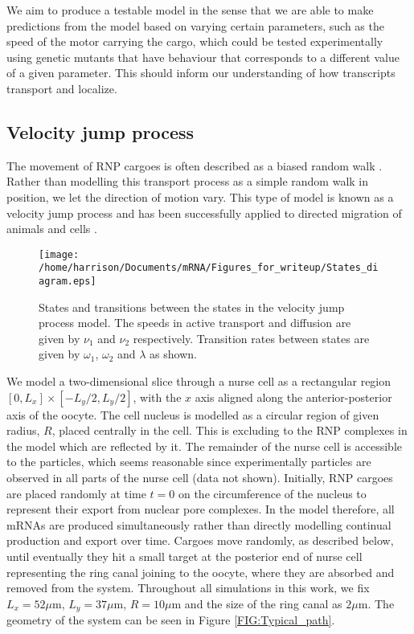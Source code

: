\documentclass[twocolumn]{biophys}
\begin{document}
We aim to produce a testable model in the sense that we are able to make predictions from the model based on varying certain parameters, such as the speed of the motor carrying the cargo, which could be tested experimentally using genetic mutants that have behaviour that corresponds to a different value of a given parameter. 
This should inform our understanding of how transcripts transport and localize.

\subsection{Velocity jump process} \label{VJ model}
The movement of RNP cargoes is often described as a biased random walk \citep{zimyanin2008vivo}.
Rather than modelling this transport process as a simple random walk in position, we let the direction of motion vary. 
This type of model is known as a velocity jump process and has been successfully applied to directed migration of animals and cells \citep{codling2005calculating, taylorking2015birds}.

\begin{figure}[h]
 \centering
 \texttt{[image: /home/harrison/Documents/mRNA/Figures\_for\_writeup/States\_diagram.eps]}
 \caption{States and transitions between the states in the velocity jump process model. The speeds in active transport and diffusion are given by $\nu_1$ and $\nu_2$ respectively. Transition rates between states are given by $\omega_1$, $\omega_2$ and $\lambda$ as shown.}
 \label{FIG:Phases_of_motion}
\end{figure}

We model a two-dimensional slice through a nurse cell as a rectangular region $[0,L_x] \times [-L_y/2, L_y/2]$, with the $x$ axis aligned along the anterior-posterior axis of the oocyte.
The cell nucleus is modelled as a circular region of given radius, $R$, placed centrally in the cell. 
This is excluding to the RNP complexes in the model which are reflected by it.
The remainder of the nurse cell is accessible to the particles, which seems reasonable since experimentally particles are observed in all parts of the nurse cell (data not shown).
Initially, RNP cargoes are placed randomly at time $t=0$ on the circumference of the nucleus to represent their export from nuclear pore complexes.
In the model therefore, all mRNAs are produced simultaneously rather than directly modelling continual production and export over time.
Cargoes move randomly, as described below, until eventually they hit a small target at the posterior end of nurse cell representing the ring canal joining to the oocyte, where they are absorbed and removed from the system.
Throughout all simulations in this work, we fix $L_x=52 \mu \text{m}$, $L_y=37 \mu \text{m}$, $R=10 \mu \text{m}$ and the size of the ring canal as $2\mu \text{m}$.
The geometry of the system can be seen in Figure \ref{FIG:Typical_path}.
\end{document}
